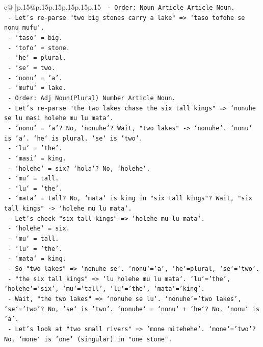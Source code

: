 \documentclass{article}
\begin{document}
{\begin{supertabular}{c@{$\;$}|p{.15\linewidth}@{}p{.15\linewidth}p{.15\linewidth}p{.15\linewidth}p{.15\linewidth}p{.15\linewidth}}
{{{\texttt{    {-} Order: Noun Article Article Noun.} \\
\texttt{  {-} Let's re{-}parse "two big stones carry a lake" => `taso tofohe se nonu mufu`.} \\
\texttt{    {-} `taso` = big.} \\
\texttt{    {-} `tofo` = stone.} \\
\texttt{    {-} `he` = plural.} \\
\texttt{    {-} `se` = two.} \\
\texttt{    {-} `nonu` = 'a'.} \\
\texttt{    {-} `mufu` = lake.} \\
\texttt{    {-} Order: Adj Noun(Plural) Number Article Noun.} \\
\texttt{  {-} Let's re{-}parse "the two lakes chase the six tall kings" => `nonuhe se lu masi holehe mu lu mata`.} \\
\texttt{    {-} `nonu` = 'a'? No, `nonuhe`? Wait, "two lakes" {-}> `nonuhe`. `nonu` is 'a'. `he` is plural. `se` is 'two'.} \\
\texttt{    {-} `lu` = 'the'.} \\
\texttt{    {-} `masi` = king.} \\
\texttt{    {-} `holehe` = six? `hola`? No, `holehe`.} \\
\texttt{    {-} `mu` = tall.} \\
\texttt{    {-} `lu` = 'the'.} \\
\texttt{    {-} `mata` = tall? No, `mata` is king in "six tall kings"? Wait, "six tall kings" {-}> `holehe mu lu mata`.} \\
\texttt{    {-} Let's check "six tall kings" => `holehe mu lu mata`.} \\
\texttt{      {-} `holehe` = six.} \\
\texttt{      {-} `mu` = tall.} \\
\texttt{      {-} `lu` = 'the'.} \\
\texttt{      {-} `mata` = king.} \\
\texttt{    {-} So "two lakes" => `nonuhe se`. `nonu`='a', `he`=plural, `se`='two'.} \\
\texttt{    {-} "the six tall kings" => `lu holehe mu lu mata`. `lu`='the', `holehe`='six', `mu`='tall', `lu`='the', `mata`='king'.} \\
\texttt{    {-} Wait, "the two lakes" => `nonuhe se lu`. `nonuhe`='two lakes', `se`='two'? No, `se` is 'two'. `nonuhe` = `nonu` + `he`? No, `nonu` is 'a'.} \\
\texttt{    {-} Let's look at "two small rivers" => `mone mitehehe`. `mone`='two'? No, `mone` is 'one' (singular) in "one stone".} \\
}}}
\end{supertabular}}
\end{document}
